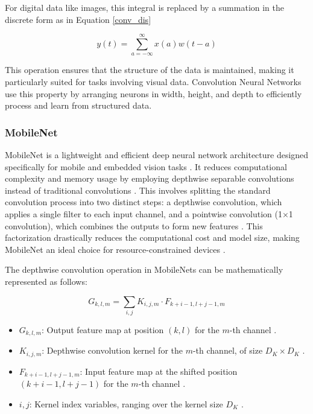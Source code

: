 For digital data like images, this integral is replaced by a summation in the discrete form as in Equation \ref{conv_dis}

\begin{equation}
    y(t) = \sum_{a=-\infty}^{\infty} x(a)w(t-a)
\label{conv_dis}
\end{equation}

This operation ensures that the structure of the data is maintained, making it particularly suited for tasks involving visual data. Convolution Neural Networks use this property by arranging neurons in width, height, and depth to efficiently process and learn from structured data.














\subsubsection{MobileNet}

MobileNet is a lightweight and efficient deep neural network architecture designed specifically for mobile and embedded vision tasks \cite{howard2017mobilenetsefficientconvolutionalneural}. It reduces computational complexity and memory usage by employing depthwise separable convolutions instead of traditional convolutions \cite{howard2017mobilenetsefficientconvolutionalneural}. This involves splitting the standard convolution process into two distinct steps: a depthwise convolution, which applies a single filter to each input channel, and a pointwise convolution (1×1 convolution), which combines the outputs to form new features \cite{howard2017mobilenetsefficientconvolutionalneural}. This factorization drastically reduces the computational cost and model size, making MobileNet an ideal choice for resource-constrained devices \cite{howard2017mobilenetsefficientconvolutionalneural}.

The depthwise convolution operation in MobileNets can be mathematically represented as follows:

\[ G_{k,l,m} = \sum_{i,j} K_{i,j,m} \cdot F_{k+i-1,l+j-1,m} \]

\begin{itemize}
    \item  \( G_{k,l,m} \): Output feature map at position \( (k, l) \) for the \( m \)-th channel \cite{howard2017mobilenetsefficientconvolutionalneural}.
    \item  \( K_{i,j,m} \): Depthwise convolution kernel for the \( m \)-th channel, of size \( D_K \times D_K \) \cite{howard2017mobilenetsefficientconvolutionalneural}.
    \item  \( F_{k+i-1,l+j-1,m} \): Input feature map at the shifted position \( (k+i-1, l+j-1) \) for the \( m \)-th channel \cite{howard2017mobilenetsefficientconvolutionalneural}.
    \item \( i, j \): Kernel index variables, ranging over the kernel size \( D_K \) \cite{howard2017mobilenetsefficientconvolutionalneural}.
\end{itemize}

